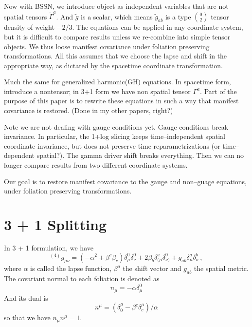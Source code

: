 \documentclass[letterpaper,nofootinbib,prd,amsmath,onecolumn]{revtex4-1}
\begin{document}
Now with BSSN, we introduce object as independent variables that are not spatial tensors $\tilde\Gamma^a$. 
And $\tilde g$ is a scalar, which means $\tilde g_{ab}$ is a type $0\choose 2$ tensor density of 
weight $-2/3$. The equations can be applied in any coordinate 
system, but it is difficult to  compare results unless we re-combine into simple tensor objects. 
We thus loose manifest covariance under foliation preserving transformations. All this assumes that we choose the 
lapse and shift in the appropriate way, as dictated by the spacetime coordinate transformation. 

Much the same for generalized harmonic(GH) equations\cite{Friedrich:1985,Garfinkle:2001ni, Pretorius:2006tp,Lindblom:2005qh}. In spacetime form, introduce 
a nontensor; in 3+1 form we have non spatial tensor $\Gamma^a$. Part of the purpose of this paper is to rewrite 
these equations in such a way that manifest covariance is restored. (Done in my other papers, right?) 

Note we are not dealing with gauge conditions yet. Gauge conditions break invariance. In particular, the 
1+log slicing keeps time--independent spatial coordinate invariance, but does not preserve time 
reparametrizations (or time--dependent spatial?). The gamma driver shift breaks everything. Then we 
can no longer compare results from two different coordinate systems. 

Our goal is to restore manifest covariance to the gauge and non--guage equations, under 
foliation preserving transformations. 

\section{3 + 1 Splitting}\label{3+1}
In 3 + 1 formulation, we have
\begin{equation*}
	{}^{\left(4\right)}g_{\mu\nu} = \left(-\alpha^2 + \beta^{c}\beta_{c}\right)\delta_\mu^0\delta_\nu^0 
	+ 2\beta_{b}\delta_{(\mu}^a\delta_{\nu)}^0 + g_{ab} \delta^a_\mu \delta^b_\nu \ ,
\end{equation*}
where $\alpha$ is called the lapse function, $\beta^{a}$ the shift vector and $g_{ab}$ the spatial metric. The covariant normal to each foliation is denoted as
\begin{equation}\label{normal covector}
n_{\mu} = -\alpha\delta^{0}_{\mu}
\end{equation}
 And its dual is
\begin{equation}\label{normal vector}
n^{\mu} = \left(\delta^{\mu}_{0} - \beta^{c}\delta^{\mu}_{c}\right)/\alpha
\end{equation}
so that we have $n_{\mu}n^{\mu} = 1$. 
\end{document}
